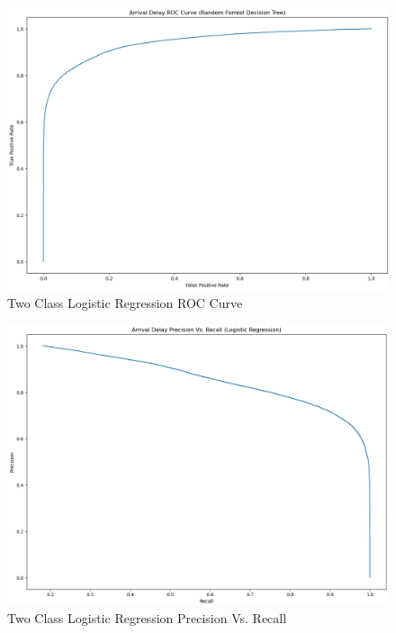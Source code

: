\documentclass[a4paper,12pt]{article}
\begin{document}
\begin{figure}[!h]
    \centering
    \includegraphics*[scale=.45]{../../img/model_rq1_roc.png}
    \caption[]{Two Class Logistic Regression ROC Curve}
    \label{fig:model:rq1:ROC}
\end{figure}

\begin{figure}[!]
    \centering
    \includegraphics*[scale=.45]{../../img/model_rq1_prec_recall.png}
    \caption[]{Two Class Logistic Regression Precision Vs. Recall}
    \label{fig:model:rq1:prec_recall}
\end{figure}
\end{document}
